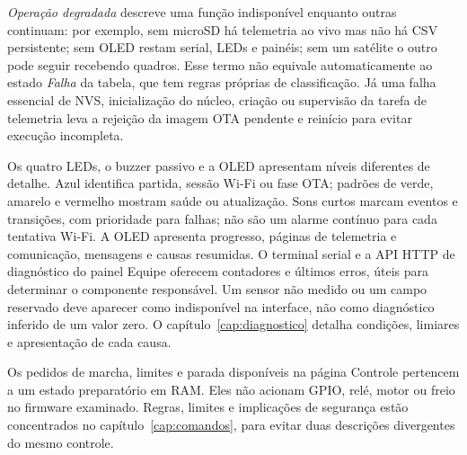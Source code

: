 \emph{Operação degradada} descreve uma função indisponível enquanto outras continuam: por exemplo, sem microSD há telemetria ao vivo mas não há CSV persistente; sem OLED restam serial, LEDs e painéis; sem um satélite o outro pode seguir recebendo quadros. Esse termo não equivale automaticamente ao estado \emph{Falha} da tabela, que tem regras próprias de classificação. Já uma falha essencial de NVS, inicialização do núcleo, criação ou supervisão da tarefa de telemetria leva a rejeição da imagem OTA pendente e reinício para evitar execução incompleta.

Os quatro LEDs, o buzzer passivo e a OLED apresentam níveis diferentes de detalhe. Azul identifica partida, sessão Wi-Fi ou fase OTA; padrões de verde, amarelo e vermelho mostram saúde ou atualização. Sons curtos marcam eventos e transições, com prioridade para falhas; não são um alarme contínuo para cada tentativa Wi-Fi. A OLED apresenta progresso, páginas de telemetria e comunicação, mensagens e causas resumidas. O terminal serial e a API HTTP de diagnóstico do painel Equipe oferecem contadores e últimos erros, úteis para determinar o componente responsável. Um sensor não medido ou um campo reservado deve aparecer como indisponível na interface, não como diagnóstico inferido de um valor zero. O capítulo~\ref{cap:diagnostico} detalha condições, limiares e apresentação de cada causa.

Os pedidos de marcha, limites e parada disponíveis na página Controle pertencem a um estado preparatório em RAM. Eles não acionam GPIO, relé, motor ou freio no firmware examinado. Regras, limites e implicações de segurança estão concentrados no capítulo~\ref{cap:comandos}, para evitar duas descrições divergentes do mesmo controle.
